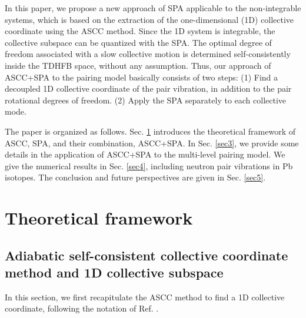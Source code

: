 \documentclass[%
superscriptaddress,
showpacs,
nofootinbib,
amsmath,amssymb,
aps,
prc,
twocolumn,
floatfix ]%
{revtex4-1}
\begin{document}
In this paper,
we propose a new approach of SPA applicable to the non-integrable systems,
which is based on the extraction of the one-dimensional (1D)
collective coordinate
using the ASCC method.
Since the 1D system is integrable,
the collective subspace can be quantized with the SPA.
The optimal degree of freedom associated with a slow collective motion
is determined self-consistently
inside the TDHFB space, without any assumption. 
Thus, our approach of ASCC+SPA to the pairing model
basically consists of two steps:
(1) Find a decoupled 1D collective coordinate of the pair vibration,
in addition to the pair rotational degrees of freedom.
(2) Apply the SPA separately to each collective mode.

The paper is organized as follows. 
Sec. \ref{sec2} introduces the theoretical framework of ASCC, SPA,
and their combination, ASCC+SPA. 
In Sec. \ref{sec3}, we provide some details in the application
of ASCC+SPA to the multi-level pairing model.
We give the numerical results in Sec. \ref{sec4}, including
neutron pair vibrations in Pb isotopes.
The conclusion and future perspectives are given in Sec. \ref{sec5}.


\section{Theoretical framework}
\label{sec2}

\subsection{Adiabatic self-consistent collective coordinate method and
1D collective subspace}
\label{ASCC}
In this section,
we first recapitulate the ASCC method to find a 1D collective coordinate,
following the notation of Ref. \cite{N2012}.
\end{document}
